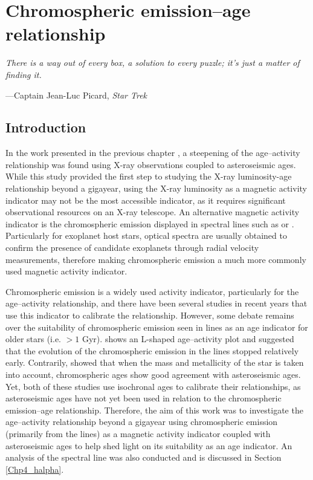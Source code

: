 
\chapter{Chromospheric emission--age relationship} %

\label{Chapter4} %

\epigraph{\itshape There is a way out of every box, a solution to every puzzle; it's just a matter of finding it.}{---Captain Jean-Luc Picard, \itshape Star Trek}

\section{Introduction}

In the work presented in the previous chapter \citep{Booth_etal_2017}, a steepening of the age--activity relationship was found using X-ray observations coupled to asteroseismic ages. While this study provided the first step to studying the X-ray luminosity-age relationship beyond a gigayear, using the X-ray luminosity as a magnetic activity indicator may not be the most accessible indicator, as it requires significant observational resources on an X-ray telescope. An alternative magnetic activity indicator is the chromospheric emission displayed in spectral lines such as \caII or \Halpha. Particularly for exoplanet host stars, optical spectra are usually obtained to confirm the presence of candidate exoplanets through radial velocity measurements, therefore making chromospheric emission a much more commonly used magnetic activity indicator.

Chromospheric emission is a widely used activity indicator, particularly for the age--activity relationship, and there have been several studies in recent years that use this indicator to calibrate the relationship. However, some debate remains over the suitability of chromospheric emission seen in \caII lines as an age indicator for older stars (i.e. $> 1$ Gyr). \citet{Pace_2013} shows an L-shaped age--activity plot and suggested that the evolution of the chromospheric emission in the \caII lines stopped relatively early. Contrarily, \citet{Lorenzo_Oliveira_etal_2016} showed that when the mass and metallicity of the star is taken into account, chromospheric ages show good agreement with asteroseismic ages. Yet, both of these studies use isochronal ages to calibrate their relationships, as asteroseismic ages have not yet been used in relation to the chromospheric emission--age relationship. Therefore, the aim of this work was to investigate the age--activity relationship beyond a gigayear using chromospheric emission (primarily from the \caII lines) as a magnetic activity indicator coupled with asteroseismic ages to help shed light on its suitability as an age indicator. An analysis of the \Halpha spectral line was also conducted and is discussed in Section \ref{Chp4_halpha}.

